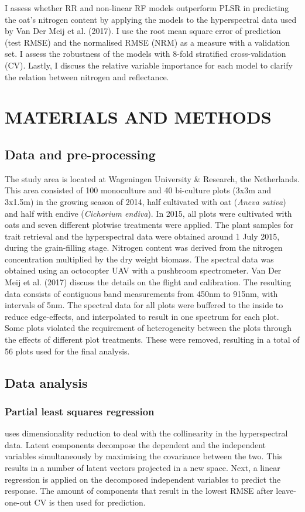 \documentclass{isprs}
\begin{document}
I assess whether RR and non-linear RF models outperform PLSR in predicting the oat's nitrogen content by applying the models to the hyperspectral data used by Van Der Meij et al. (2017). I use the root mean square error of prediction (test RMSE) and the normalised RMSE (NRM) as a measure with a validation set. I assess the robustness of the models with 8-fold stratified cross-validation (CV). Lastly, I discuss the relative variable importance for each model to clarify the relation between nitrogen and reflectance.

\section{MATERIALS AND METHODS}

\subsection{Data and pre-processing}
The study area is located at Wageningen University \& Research, the Netherlands. This area consisted of 100 monoculture and 40 bi-culture plots (3x3m and 3x1.5m) in the growing season of 2014, half cultivated with oat (\textit{Aneva sativa}) and half with endive (\textit{Cichorium endiva}). In 2015, all plots were cultivated with oats and seven different plotwise treatments were applied. The plant samples for trait retrieval and the hyperspectral data were obtained around 1 July 2015, during the grain-filling stage. Nitrogen content was derived from the nitrogen concentration multiplied by the dry weight biomass. The spectral data was obtained using an octocopter UAV with a pushbroom spectrometer. Van Der Meij et al. (2017) discuss the details on the flight and calibration. The resulting data consists of contiguous band measurements from 450nm to 915nm, with intervals of 5nm. The spectral data for all plots were buffered to the inside to reduce edge-effects, and interpolated to result in one spectrum for each plot. Some plots violated the requirement of heterogeneity between the plots through the effects of different plot treatments. These were removed, resulting in a total of 56 plots used for the final analysis.


\subsection{Data analysis}

\subsubsection{Partial least squares regression} uses dimensionality reduction to deal with the collinearity in the hyperspectral data. Latent components decompose the dependent and the independent variables simultaneously by maximising the covariance between the two. This results in a number of latent vectors projected in a new space. Next, a linear regression is applied on the decomposed independent variables to predict the response. The amount of components that result in the lowest RMSE after leave-one-out CV is then used for prediction.
\end{document}
